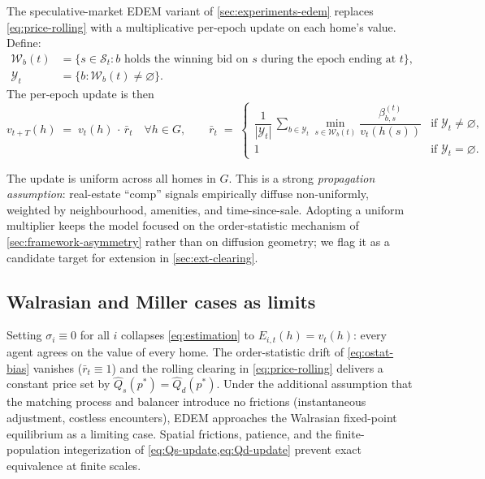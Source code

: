 The speculative-market EDEM variant of \cref{sec:experiments-edem}
replaces \cref{eq:price-rolling} with a multiplicative per-epoch
update on each home's value. Define:
\begin{align*}
\mathcal{W}_{b}(t) &= \{s \in \mathcal{S}_{t} : b \text{ holds the winning bid on } s \text{ during the epoch ending at } t\}, \\
\mathcal{Y}_{t}    &= \{b : \mathcal{W}_{b}(t) \neq \varnothing\}.
\end{align*}
The per-epoch update is then
\begin{equation}
\label{eq:value-update}
v_{t+T}(h) \;=\; v_{t}(h)\,\cdot\,\bar{r}_{t} \quad \forall h \in G,
\qquad
\bar{r}_{t} \;=\;
\begin{cases}
\dfrac{1}{|\mathcal{Y}_{t}|}\,\displaystyle\sum_{b \in \mathcal{Y}_{t}} \min_{s \in \mathcal{W}_{b}(t)} \dfrac{\beta_{b,s}^{(t)}}{v_{t}(h(s))}
& \text{if } \mathcal{Y}_{t} \neq \varnothing, \\[1.6ex]
1 & \text{if } \mathcal{Y}_{t} = \varnothing.
\end{cases}
\end{equation}

The update is uniform across all homes in $G$. This is a strong
\emph{propagation assumption}: real-estate ``comp'' signals
empirically diffuse non-uniformly, weighted by neighbourhood,
amenities, and time-since-sale. Adopting a uniform multiplier keeps
the model focused on the order-statistic mechanism of
\cref{sec:framework-asymmetry} rather than on diffusion geometry; we
flag it as a candidate target for extension in \cref{sec:ext-clearing}.

\subsection{Walrasian and Miller cases as limits}
\label{sec:framework-walras-miller}

Setting $\sigma_{i} \equiv 0$ for all $i$ collapses
\cref{eq:estimation} to $E_{i,t}(h) = v_{t}(h)$: every agent agrees
on the value of every home. The order-statistic drift of
\cref{eq:ostat-bias} vanishes ($\bar{r}_{t} \equiv 1$) and the
rolling clearing in \cref{eq:price-rolling} delivers a constant
price set by $\hat{Q}_{s}(p^{*}) = \hat{Q}_{d}(p^{*})$. Under the
additional assumption that the matching process and balancer
introduce no frictions (instantaneous adjustment, costless
encounters), EDEM approaches the Walrasian fixed-point equilibrium
as a limiting case. Spatial frictions, patience, and the
finite-population integerization of \cref{eq:Qs-update,eq:Qd-update}
prevent exact equivalence at finite scales.

